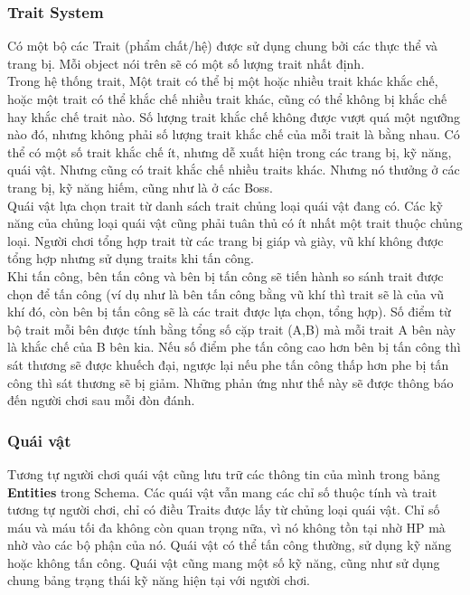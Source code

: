 \subsubsection{Trait System}
\hspace*{0.5cm} Có một bộ các Trait (phẩm chất/hệ) được sử dụng chung bởi các thực thể và trang bị. Mỗi object nói trên sẽ có một số lượng trait nhất định.\\
\hspace*{0.5cm} Trong hệ thống trait, Một trait có thể bị một hoặc nhiều trait khác khắc chế, hoặc một trait có thể khắc chế nhiều trait khác, cũng có thể không bị khắc chế hay khắc chế trait nào. Số lượng trait khắc chế không được vượt quá một ngưỡng nào đó, nhưng không phải số lượng trait khắc chế của mỗi trait là bằng nhau. Có thể có một số trait khắc chế ít, nhưng dễ xuất hiện trong các trang bị, kỹ năng, quái vật. Nhưng cũng có trait khắc chế nhiều traits khác. Nhưng nó thưởng ở các trang bị, kỹ năng hiếm, cũng như là ở các Boss.\\ 
\hspace*{0.5cm} Quái vật lựa chọn trait từ danh sách trait chủng loại quái vật đang có. Các kỹ năng của chủng loại quái vật cũng phải tuân thủ có ít nhất một trait thuộc chủng loại. Người chơi tổng hợp trait từ các trang bị giáp và giày, vũ khí không được tổng hợp nhưng sử dụng traits khi tấn công.\\
\hspace*{0.5cm} Khi tấn công, bên tấn công và bên bị tấn công sẽ tiến hành so sánh trait được chọn để tấn công (ví dụ như là bên tấn công bằng vũ khí thì trait sẽ là của vũ khí đó, còn bên bị tấn công sẽ là các trait được lựa chọn, tổng hợp). Số điểm từ bộ trait mỗi bên được tính bằng tổng số cặp trait (A,B) mà mỗi trait A bên này là khắc chế của B bên kia. Nếu số điểm phe tấn công cao hơn bên bị tấn công thì sát thương sẽ được khuếch đại, ngược lại nếu phe tấn công thấp hơn phe bị tấn công thì sát thương sẽ bị giảm. Những phản ứng như thế này sẽ được thông báo đến người chơi sau mỗi đòn đánh.\\



\subsubsection{Quái vật}
\hspace*{0.5cm} Tương tự người chơi quái vật cũng lưu trữ các thông tin của mình trong bảng \textbf{Entities} trong Schema. Các quái vật vẫn mang các chỉ số thuộc tính và trait tương tự người chơi, chỉ có điều Traits được lấy từ chủng loại quái vật. Chỉ số máu và máu tối đa không còn quan trọng nữa, vì nó không tồn tại nhờ HP mà nhờ vào các bộ phận của nó. Quái vật có thể tấn công thường, sử dụng kỹ năng hoặc không tấn công. Quái vật cũng mang một số kỹ năng, cũng như sử dụng chung bảng trạng thái kỹ năng hiện tại với người chơi.\\

